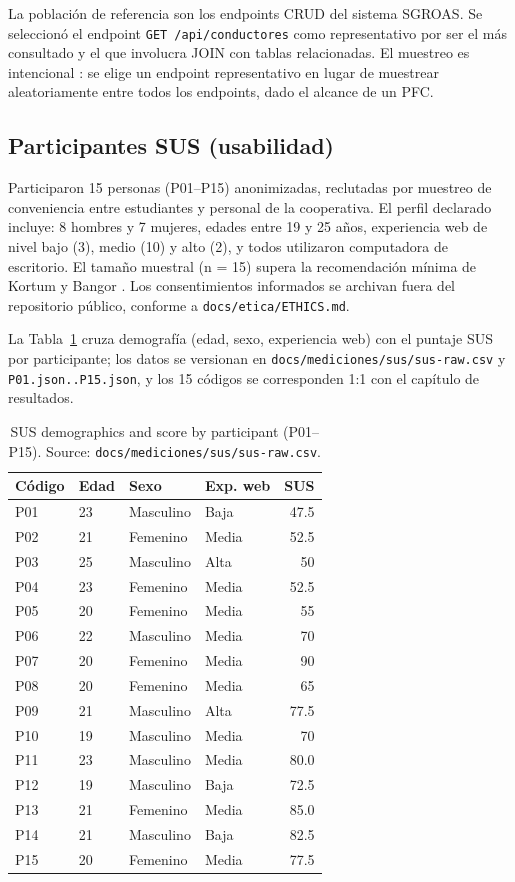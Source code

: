 La población de referencia son los endpoints CRUD del sistema SGROAS. Se seleccionó el endpoint \texttt{GET /api/conductores} como representativo por ser el más consultado y el que involucra JOIN con tablas relacionadas. El muestreo es intencional \cite{baltes2022}: se elige un endpoint representativo en lugar de muestrear aleatoriamente entre todos los endpoints, dado el alcance de un PFC.

\subsection{Participantes SUS (usabilidad)}

Participaron 15 personas (P01--P15) anonimizadas, reclutadas por muestreo de conveniencia entre estudiantes y personal de la cooperativa. El perfil declarado incluye: 8 hombres y 7 mujeres, edades entre 19 y 25 años, experiencia web de nivel bajo (3), medio (10) y alto (2), y todos utilizaron computadora de escritorio. El tamaño muestral (n = 15) supera la recomendación mínima de Kortum y Bangor \cite{kortum2013}. Los consentimientos informados se archivan fuera del repositorio público, conforme a \texttt{docs/etica/ETHICS.md}.

La Tabla~\ref{tab:sus-demografia} cruza demografía (edad, sexo, experiencia web) con el puntaje SUS por participante; los datos se versionan en \texttt{docs/mediciones/sus/sus-raw.csv} y \texttt{P01.json..P15.json}, y los 15 códigos se corresponden 1:1 con el capítulo de resultados.

\begin{table}[htbp]
\caption{SUS demographics and score by participant (P01--P15). Source: \texttt{docs/mediciones/sus/sus-raw.csv}.}
\label{tab:sus-demografia}
\small
\begin{tabular}{@{}llllr@{}}
\toprule
\textbf{Código} & \textbf{Edad} & \textbf{Sexo} & \textbf{Exp. web} & \textbf{SUS} \\
\midrule
P01 & 23 & Masculino & Baja & 47.5 \\
P02 & 21 & Femenino & Media & 52.5 \\
P03 & 25 & Masculino & Alta & 50 \\
P04 & 23 & Femenino & Media & 52.5 \\
P05 & 20 & Femenino & Media & 55 \\
P06 & 22 & Masculino & Media & 70 \\
P07 & 20 & Femenino & Media & 90 \\
P08 & 20 & Femenino & Media & 65 \\
P09 & 21 & Masculino & Alta & 77.5 \\
P10 & 19 & Masculino & Media & 70 \\
P11 & 23 & Masculino & Media & 80.0 \\
P12 & 19 & Masculino & Baja & 72.5 \\
P13 & 21 & Femenino & Media & 85.0 \\
P14 & 21 & Masculino & Baja & 82.5 \\
P15 & 20 & Femenino & Media & 77.5 \\
\bottomrule
\end{tabular}
\end{table}

